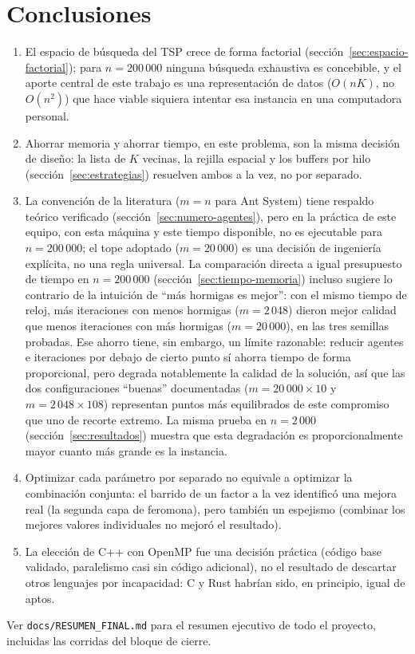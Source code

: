 \documentclass[12pt,a4paper]{article}
\begin{document}
\section{Conclusiones}
\begin{enumerate}
\item El espacio de búsqueda del TSP crece de forma factorial
(sección~\ref{sec:espacio-factorial}); para $n=200\,000$ ninguna búsqueda
exhaustiva es concebible, y el aporte central de este trabajo es una
representación de datos ($O(nK)$, no $O(n^2)$) que hace viable siquiera
intentar esa instancia en una computadora personal.
\item Ahorrar memoria y ahorrar tiempo, en este problema, son la misma
decisión de diseño: la lista de $K$ vecinas, la rejilla espacial y los
buffers por hilo (sección~\ref{sec:estrategias}) resuelven ambos a la vez,
no por separado.
\item La convención de la literatura ($m=n$ para Ant System) tiene
respaldo teórico verificado (sección~\ref{sec:numero-agentes}), pero en la
práctica de este equipo, con esta máquina y este tiempo disponible, no es
ejecutable para $n=200\,000$; el tope adoptado ($m=20\,000$) es una decisión
de ingeniería explícita, no una regla universal. La comparación directa a
igual presupuesto de tiempo en $n=200\,000$ (sección~\ref{sec:tiempo-memoria})
incluso sugiere lo contrario de la intuición de ``más hormigas es mejor'':
con el mismo tiempo de reloj, más iteraciones con menos hormigas
($m=2\,048$) dieron mejor calidad que menos iteraciones con más hormigas
($m=20\,000$), en las tres semillas probadas. Ese ahorro tiene, sin
embargo, un límite razonable: reducir agentes e iteraciones por debajo de
cierto punto sí ahorra tiempo de forma proporcional, pero degrada
notablemente la calidad de la solución, así que las dos configuraciones
``buenas'' documentadas ($m=20\,000{\times}10$ y $m=2\,048{\times}108$)
representan puntos más equilibrados de este compromiso que uno de
recorte extremo. La misma prueba en $n=2\,000$ (sección~\ref{sec:resultados})
muestra que esta degradación es proporcionalmente mayor cuanto más grande
es la instancia.
\item Optimizar cada parámetro por separado no equivale a optimizar la
combinación conjunta: el barrido de un factor a la vez identificó una
mejora real (la segunda capa de feromona), pero también un espejismo
(combinar los mejores valores individuales no mejoró el resultado).
\item La elección de C++ con OpenMP fue una decisión práctica (código base
validado, paralelismo casi sin código adicional), no el resultado de
descartar otros lenguajes por incapacidad: C y Rust habrían sido, en
principio, igual de aptos.
\end{enumerate}

Ver \texttt{docs/RESUMEN\_FINAL.md} para el resumen ejecutivo de todo el
proyecto, incluidas las corridas del bloque de cierre.
\end{document}
